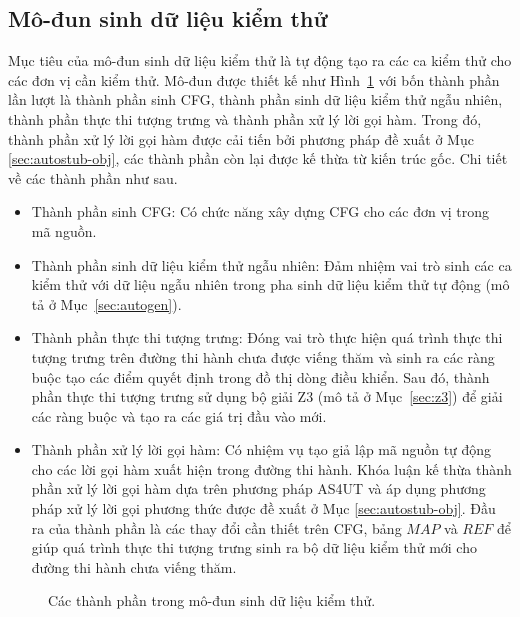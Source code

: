 \subsection{Mô-đun sinh dữ liệu kiểm thử}\label{sec:module-autogen}
Mục tiêu của mô-đun sinh dữ liệu kiểm thử là tự động tạo ra các ca kiểm thử cho các đơn vị cần kiểm thử. Mô-đun được thiết kế như Hình~\ref{fig:module-autogen} với bốn thành phần lần lượt là thành phần sinh CFG, thành phần sinh dữ liệu kiểm thử ngẫu nhiên, thành phần thực thi tượng trưng và thành phần xử lý lời gọi hàm. Trong đó, thành phần xử lý lời gọi hàm được cải tiến bởi phương pháp đề xuất ở Mục \ref{sec:autostub-obj}, các thành phần còn lại được kế thừa từ kiến trúc gốc. Chi tiết về các thành phần như sau.
\begin{itemize}
    \item Thành phần sinh CFG: Có chức năng xây dựng CFG cho các đơn vị trong mã nguồn.
    \item Thành phần sinh dữ liệu kiểm thử ngẫu nhiên: Đảm nhiệm vai trò sinh các ca kiểm thử với dữ liệu ngẫu nhiên trong pha sinh dữ liệu kiểm thử tự động (mô tả ở Mục~\ref{sec:autogen}). 
    \item Thành phần thực thi tượng trưng: Đóng vai trò thực hiện quá trình thực thi tượng trưng trên đường thi hành chưa được viếng thăm và sinh ra các ràng buộc tạo các điểm quyết định trong đồ thị dòng điều khiển. Sau đó, thành phần thực thi tượng trưng sử dụng bộ giải Z3 (mô tả ở Mục~\ref{sec:z3}) để giải các ràng buộc và tạo ra các giá trị đầu vào mới.
    \item Thành phần xử lý lời gọi hàm: Có nhiệm vụ tạo giả lập mã nguồn tự động cho các lời gọi hàm xuất hiện trong đường thi hành. Khóa luận kế thừa thành phần xử lý lời gọi hàm dựa trên phương pháp AS4UT và áp dụng phương pháp xử lý lời gọi phương thức được đề xuất ở Mục \ref{sec:autostub-obj}. Đầu ra của thành phần là các thay đổi cần thiết trên CFG, bảng $MAP$ và $REF$ để giúp quá trình thực thi tượng trưng sinh ra bộ dữ liệu kiểm thử mới cho đường thi hành chưa viếng thăm.
\end{itemize}

\begin{figure}[h]
    \centering
    
    \caption{Các thành phần trong mô-đun sinh dữ liệu kiểm thử.}
    \label{fig:module-autogen}
\end{figure}
%     

